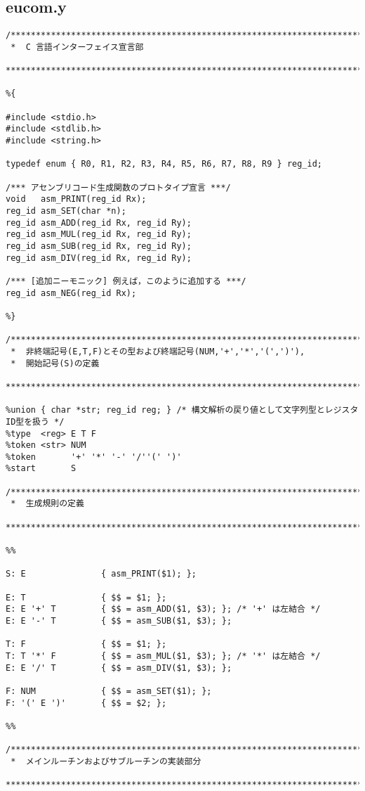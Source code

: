 \documentclass[a4j]{jsarticle}  %
\begin{document}
\subsection{eucom.y}
\begin{verbatim}
/*****************************************************************************
 *  C 言語インターフェイス宣言部
 *****************************************************************************/

%{

#include <stdio.h>
#include <stdlib.h>
#include <string.h>

typedef enum { R0, R1, R2, R3, R4, R5, R6, R7, R8, R9 } reg_id;

/*** アセンブリコード生成関数のプロトタイプ宣言 ***/
void   asm_PRINT(reg_id Rx);
reg_id asm_SET(char *n);
reg_id asm_ADD(reg_id Rx, reg_id Ry);
reg_id asm_MUL(reg_id Rx, reg_id Ry);
reg_id asm_SUB(reg_id Rx, reg_id Ry);
reg_id asm_DIV(reg_id Rx, reg_id Ry);

/*** [追加ニーモニック] 例えば，このように追加する ***/
reg_id asm_NEG(reg_id Rx);

%}

/*****************************************************************************
 *  非終端記号(E,T,F)とその型および終端記号(NUM,'+','*','(',')'),
 *  開始記号(S)の定義
 *****************************************************************************/

%union { char *str; reg_id reg; } /* 構文解析の戻り値として文字列型とレジスタID型を扱う */
%type  <reg> E T F
%token <str> NUM
%token       '+' '*' '-' '/''(' ')'
%start       S

/*****************************************************************************
 *  生成規則の定義
 *****************************************************************************/

%%

S: E               { asm_PRINT($1); };

E: T               { $$ = $1; };
E: E '+' T         { $$ = asm_ADD($1, $3); }; /* '+' は左結合 */
E: E '-' T         { $$ = asm_SUB($1, $3); };

T: F               { $$ = $1; };
T: T '*' F         { $$ = asm_MUL($1, $3); }; /* '*' は左結合 */
E: E '/' T         { $$ = asm_DIV($1, $3); };

F: NUM             { $$ = asm_SET($1); };
F: '(' E ')'       { $$ = $2; };

%%

/*****************************************************************************
 *  メインルーチンおよびサブルーチンの実装部分
 *****************************************************************************/


\end{verbatim}
\end{document}
